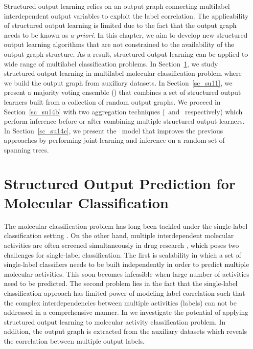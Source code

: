 {Structured output learning relies on an output graph connecting multilabel interdependent output variables to exploit the label correlation.
The applicability of structured output learning is limited due to the fact that the output graph needs to be known as \textit{a-priori}.
In this chapter, we aim to develop new structured output learning algorithms that are not constrained to the availability of the output graph structure.
As a result, structured output learning can be applied to wide range of multilabel classification problems.
In Section~\ref{sc_su10}, we study structured output learning in multilabel molecular classification problem where we build the output graph from auxiliary datasets.
In Section~\ref{sc_su11}, we present a majority voting ensemble (\mve) that combines a set of structured output learners built from a collection of random output graphs.
We proceed in Section~\ref{sc_su14b} with two aggregation techniques (\amm\ and \mam\ respectively) which perform inference before or after combining multiple structured output learners.
In Section~\ref{sc_su14c}, we present the \rta\ model that improves the previous approaches by performing joint learning and inference on a random set of spanning trees.



%
%
\section{Structured Output Prediction for Molecular Classification} \label{sc_su10}

The molecular classification problem has long been tackled under the single-label classification setting \citep{Menchetti05weighted,Singh12qsar,Dutt12classification}.
On the other hand, multiple interdependent molecular activities are often screened simultaneously in drug research \citep{Shoemaker06the}, which poses two challenges for single-label classification.
The first is scalability in which a set of single-label classifiers needs to be built independently in order to predict multiple molecular activities.
This soon becomes infeasible when large number of activities need to be predicted.
The second problem lies in the fact that the single-label classification approach has limited power of modeling label correlation such that the complex interdependencies between multiple activities (labels) can not be addressed in a comprehensive manner.
In  we investigate the potential of applying structured output learning to molecular activity classification problem.
In addition, the output graph is extracted from the auxiliary datasets which reveals the correlation between multiple output labels.


}
